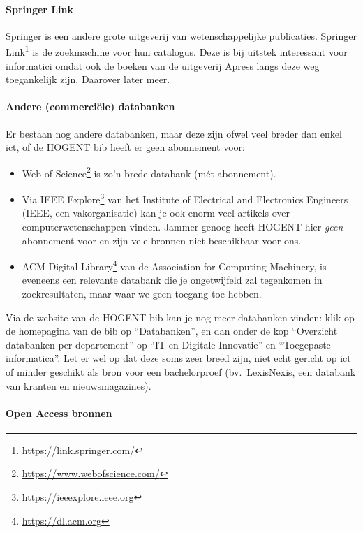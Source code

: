 \paragraph{Springer Link}

Springer is een andere grote uitgeverij van wetenschappelijke publicaties. Springer Link\footnote{\url{https://link.springer.com/}} is de zoekmachine voor hun catalogus. Deze is bij uitstek interessant voor informatici omdat ook de boeken van de uitgeverij Apress langs deze weg toegankelijk zijn. Daarover later meer.

\paragraph{Andere (commerciële) databanken}

Er bestaan nog andere databanken, maar deze zijn ofwel veel breder dan enkel ict, of de HOGENT bib heeft er geen abonnement voor:

\begin{itemize}
  \item Web of Science\footnote{\url{https://www.webofscience.com/}} is zo'n brede databank (mét abonnement).
  \item Via IEEE Explore\footnote{\url{https://ieeexplore.ieee.org}} van het Institute of Electrical and Electronics Engineers (IEEE, een vakorganisatie) kan je ook enorm veel artikels over computerwetenschappen vinden. Jammer genoeg heeft HOGENT hier \textit{geen} abonnement voor en zijn vele bronnen niet beschikbaar voor ons.
  \item ACM Digital Library\footnote{\url{https://dl.acm.org}} van de Association for Computing Machinery, is eveneens een relevante databank die je ongetwijfeld zal tegenkomen in zoekresultaten, maar waar we geen toegang toe hebben.
\end{itemize}

Via de website van de HOGENT bib kan je nog meer databanken vinden: klik op de homepagina van de bib op ``Databanken'', en dan onder de kop ``Overzicht databanken per departement'' op ``IT en Digitale Innovatie'' en ``Toegepaste informatica''. Let er wel op dat deze soms zeer breed zijn, niet echt gericht op ict of minder geschikt als bron voor een bachelorproef (bv.\ LexisNexis, een databank van kranten en nieuwsmagazines).

\paragraph{Open Access bronnen}

